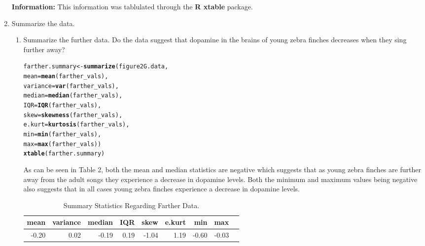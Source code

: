 \documentclass{article}\usepackage[]{graphicx}\usepackage[]{xcolor}
\makeatletter
\newcommand{\hldef}[1]{\textcolor[rgb]{0.345,0.345,0.345}{#1}}%
\newcommand{\hlkwb}[1]{\textcolor[rgb]{0.69,0.353,0.396}{#1}}%
\newcommand{\hlkwc}[1]{\textcolor[rgb]{0.333,0.667,0.333}{#1}}%
\newcommand{\hlkwd}[1]{\textcolor[rgb]{0.737,0.353,0.396}{\textbf{#1}}}%
\newenvironment{kframe}{%
 \def\at@end@of@kframe{}%
 \ifinner\ifhmode%
  \def\at@end@of@kframe{\end{minipage}}%
  \begin{minipage}{\columnwidth}%
 \fi\fi%
 \def\FrameCommand##1{\hskip\@totalleftmargin \hskip-\fboxsep
 \colorbox{shadecolor}{##1}\hskip-\fboxsep
     \hskip-\linewidth \hskip-\@totalleftmargin \hskip\columnwidth}%
 \MakeFramed {\advance\hsize-\width
   \@totalleftmargin\z@ \linewidth\hsize
   \@setminipage}}%
 {\par\unskip\endMakeFramed%
 \at@end@of@kframe}
\newenvironment{knitrout}{}{} %
\makeatother
\begin{document}
\begin{enumerate}
\textbf{Information:} This information was tablulated through the \textbf{R xtable} package.
\newpage

\item Summarize the data.
\begin{enumerate}
  \item Summarize the further data. Do the data suggest that
   dopamine in the brains of young zebra finches decreases when
   they sing further away?
\begin{knitrout}
\color{fgcolor}\begin{kframe}
\begin{alltt}
\hldef{farther.summary} \hlkwb{<-} \hlkwd{summarize}\hldef{(figure2G.data,}
                            \hlkwc{mean} \hldef{=} \hlkwd{mean}\hldef{(farther_vals),}
                            \hlkwc{variance} \hldef{=} \hlkwd{var}\hldef{(farther_vals),}
                            \hlkwc{median} \hldef{=} \hlkwd{median}\hldef{(farther_vals),}
                            \hlkwc{IQR} \hldef{=} \hlkwd{IQR}\hldef{(farther_vals),}
                            \hlkwc{skew} \hldef{=} \hlkwd{skewness}\hldef{(farther_vals),}
                            \hlkwc{e.kurt} \hldef{=} \hlkwd{kurtosis}\hldef{(farther_vals),}
                            \hlkwc{min} \hldef{=} \hlkwd{min}\hldef{(farther_vals),}
                            \hlkwc{max} \hldef{=} \hlkwd{max}\hldef{(farther_vals))}
\hlkwd{xtable}\hldef{(farther.summary)}
\end{alltt}
\end{kframe}
\end{knitrout}

As can be seen in Table 2, both the mean and median statistics are negative which suggests that as young zebra finches are further away from the adult songs they experience a decrease in dopamine levels. Both the minimum and maximum values being negative also suggests that in all cases young zebra finches experience a decrease in dopamine levels.

\begin{table}[ht]
\centering
\begin{tabular}{rrrrrrrrr}
  \hline
mean & variance & median & IQR & skew & e.kurt & min & max \\ 
  \hline
-0.20 & 0.02 & -0.19 & 0.19 & -1.04 & 1.19 & -0.60 & -0.03 \\ 
   \hline
\end{tabular}
\caption{Summary Statistics Regarding Farther Data.}
\label{table2}
\end{table}


\end{enumerate}
\end{enumerate}
\end{document}
